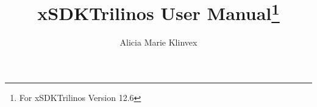 \documentclass[pdf,12pt,report,strict]{SANDreport}
\title{xSDKTrilinos User Manual\footnote{For xSDKTrilinos Version 12.6}}
\author{Alicia Marie Klinvex}
\begin{document}
\maketitle



%


\SANDmain





\appendix

\end{document}

